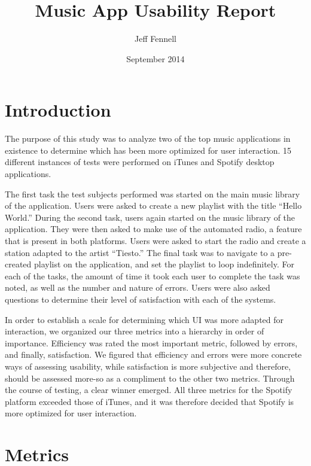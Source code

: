 \documentclass[12pt]{article}
\begin{document}
\title{Music App Usability Report}
\author{Jeff Fennell}
\date{September 2014}
\maketitle

\tableofcontents

\section{Introduction}

The purpose of this study was to analyze two of the top music 
applications in existence to determine which has been more 
optimized for user interaction. 15 different instances of tests 
were performed on iTunes and Spotify desktop applications.

The first task the test subjects performed was started on the main 
music library of the application. Users were asked to create a new 
playlist with the title ``Hello World.''  During the second task, 
users again started on the music library of the application. They 
were then asked to make use of the automated radio, a feature that 
is present in both platforms. Users were asked to start the radio 
and create a station adapted to the artist ``Tiesto.'' The final 
task was to navigate to a pre-created playlist on the application, 
and set the playlist to loop indefinitely. For each of the tasks, 
the amount of time it took each user to complete the task was 
noted, as well as the number and nature of errors. Users were also 
asked questions to determine their level of satisfaction with each 
of the systems.

In order to establish a scale for determining which UI was more 
adapted for interaction, we organized our three metrics into a 
hierarchy in order of importance. Efficiency was rated the most 
important metric, followed by errors, and finally, satisfaction. 
We figured that efficiency and errors were more concrete ways of 
assessing usability, while satisfaction is more subjective and 
therefore, should be assessed more-so as a compliment to the other 
two metrics. Through the course of testing, a clear winner 
emerged. All three metrics for the Spotify platform exceeded those 
of iTunes, and it was therefore decided that Spotify is more 
optimized for user interaction.

\section{Metrics}
\end{document}

